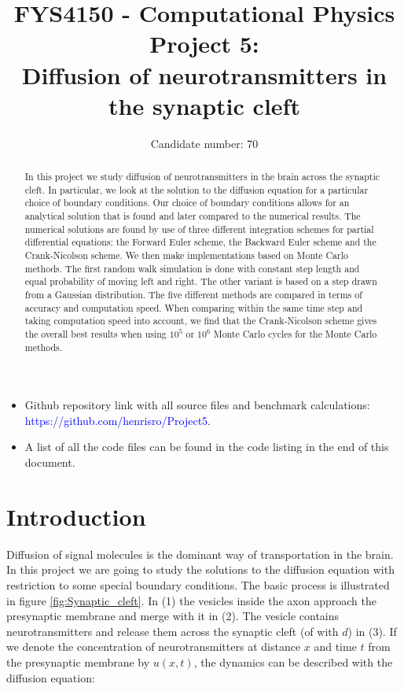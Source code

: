 \documentclass[a4paper, 11pt, notitlepage,english]{article}
\author{Candidate number: 70}
\title{FYS4150 - Computational Physics \\
      Project 5: \\
       Diffusion of neurotransmitters in the synaptic cleft}
\begin{document}
\maketitle

\begin{abstract}
In this project we study diffusion of neurotransmitters in the brain across the synaptic cleft. In particular, we look at the solution to the diffusion equation for a particular choice of boundary conditions. Our choice of boundary conditions allows for an analytical solution that is found and later compared to the numerical results. The numerical solutions are found by use of three different integration schemes for partial differential equations: the Forward Euler scheme, the Backward Euler scheme and the Crank-Nicolson scheme. We then make implementations based on Monte Carlo methods. The first random walk simulation is done with constant step length and equal probability of moving left and right. The other variant is based on a step drawn from a Gaussian distribution. The five different methods are compared in terms of accuracy and computation speed. When comparing within the same time step and taking computation speed into account, we find that the Crank-Nicolson scheme gives the overall best results when using $10^5$ or $10^6$ Monte Carlo cycles for the Monte Carlo methods. \\
\end{abstract}

\begin{itemize}
\item Github repository link with all source files and benchmark calculations: \\
 \textcolor{blue}{https://github.com/henrisro/Project5}.
\item A list of all the code files can be found in the code listing in the end of this document.
\end{itemize}

\section{Introduction}

Diffusion of signal molecules is the dominant way of transportation in the brain. In this project we are going to study the solutions to the diffusion equation with restriction to some special boundary conditions. The basic process is illustrated in figure \ref{fig:Synaptic_cleft}. In (1) the vesicles inside the axon approach the presynaptic membrane and merge with it in (2). The vesicle contains neurotransmitters and release them across the synaptic cleft (of with $d$) in (3). If we denote the concentration of neurotransmitters at distance $x$ and time $t$ from the presynaptic membrane by $u(x,t)$, the dynamics can be described with the diffusion equation:
\end{document}
